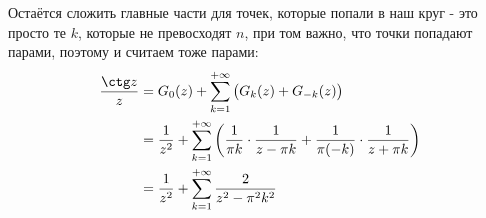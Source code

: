 Остаётся сложить главные части для точек, которые попали в наш круг - это просто те $k$, которые не превосходят $n$, при том важно, что точки попадают парами, поэтому и считаем тоже парами:
\begin{align*}
    \frac{\ctg z}{z} &= G_0(z) + \sum\limits_{k=1}^{+\infty} \left( G_k(z) + G_{-k}(z)\right) \\ 
    &= \frac{1}{z^2} + \sum\limits_{k=1}^{+\infty} \left( \frac{1}{\pi k} \cdot \frac{1}{z - \pi k} + \frac{1}{\pi (-k)} \cdot \frac{1}{z + \pi k} \right) \\ 
    &= \frac{1}{z^2} + \sum\limits_{k=1}^{+\infty} \frac{2}{z^2-\pi^2k^2}
\end{align*}
\newpage

